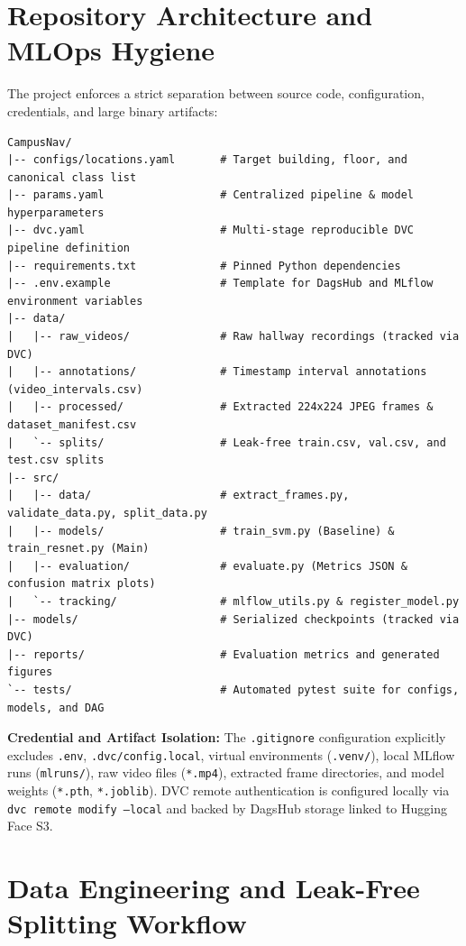 \documentclass[10pt,a4paper]{article}
\begin{document}
\section{Repository Architecture and MLOps Hygiene}
The project enforces a strict separation between source code, configuration, credentials, and large binary artifacts:
\noindent\begin{minipage}{\textwidth}
\small
\begin{verbatim}
CampusNav/
|-- configs/locations.yaml       # Target building, floor, and canonical class list
|-- params.yaml                  # Centralized pipeline & model hyperparameters
|-- dvc.yaml                     # Multi-stage reproducible DVC pipeline definition
|-- requirements.txt             # Pinned Python dependencies
|-- .env.example                 # Template for DagsHub and MLflow environment variables
|-- data/
|   |-- raw_videos/              # Raw hallway recordings (tracked via DVC)
|   |-- annotations/             # Timestamp interval annotations (video_intervals.csv)
|   |-- processed/               # Extracted 224x224 JPEG frames & dataset_manifest.csv
|   `-- splits/                  # Leak-free train.csv, val.csv, and test.csv splits
|-- src/
|   |-- data/                    # extract_frames.py, validate_data.py, split_data.py
|   |-- models/                  # train_svm.py (Baseline) & train_resnet.py (Main)
|   |-- evaluation/              # evaluate.py (Metrics JSON & confusion matrix plots)
|   `-- tracking/                # mlflow_utils.py & register_model.py
|-- models/                      # Serialized checkpoints (tracked via DVC)
|-- reports/                     # Evaluation metrics and generated figures
`-- tests/                       # Automated pytest suite for configs, models, and DAG
\end{verbatim}
\end{minipage}

\textbf{Credential and Artifact Isolation:} The \texttt{.gitignore} configuration explicitly excludes \texttt{.env}, \texttt{.dvc/config.local}, virtual environments (\texttt{.venv/}), local MLflow runs (\texttt{mlruns/}), raw video files (\texttt{*.mp4}), extracted frame directories, and model weights (\texttt{*.pth}, \texttt{*.joblib}). DVC remote authentication is configured locally via \texttt{dvc remote modify --local} and backed by DagsHub storage linked to Hugging Face S3.

\section{Data Engineering and Leak-Free Splitting Workflow}
\end{document}
